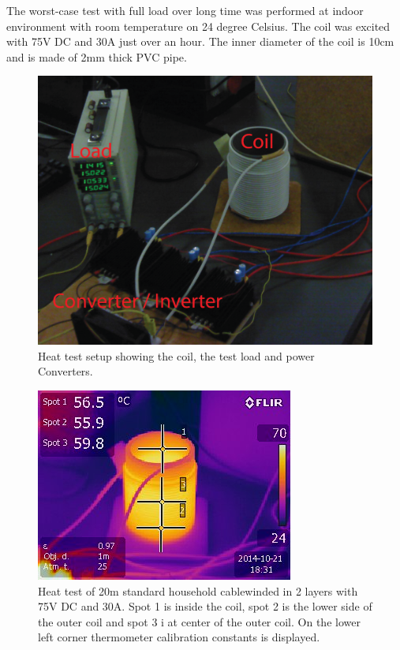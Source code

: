 \noindent
The worst-case test with full load over long time was performed at indoor environment with room temperature on 24 degree Celsius. The coil was excited with 75V DC and 30A just over an hour. The inner diameter of the coil is 10cm and is made of 2mm thick PVC pipe.

\begin{figure}[H]
   \centering
   \includegraphics[scale=0.5]{graphics/heat_test/heat_test_setup.png}
   \caption{Heat test setup showing the coil, the test load and power Converters.}
   \end{figure}
      

\begin{figure}[H]
\centering
\includegraphics[scale=1]{graphics/heat_test/IR_1491.jpg}
\caption[Caption for LOF]{Heat test of 20m standard household cable\footnotemark winded in 2 layers with 75V DC and 30A. Spot 1 is inside the coil, spot 2 is the lower side of the outer coil and spot 3 i at center of the outer coil. On the lower left corner thermometer calibration constants is displayed.}
\label{fig:heat_test_ir}
\end{figure}


